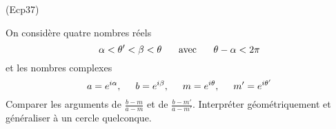 \begin{tiny}(Ecp37)\end{tiny} On considère quatre nombres réels
\begin{displaymath}
  \alpha < \theta' < \beta < \theta \hspace{0.5cm}\text{ avec } \hspace{0.5cm}\theta - \alpha < 2\pi 
\end{displaymath}
et les nombres complexes
\begin{displaymath}
  a = e^{i\alpha},\hspace{0.5cm} b = e^{i\beta},\hspace{0.5cm} m = e^{i\theta},\hspace{0.5cm} m' = e^{i\theta'}
\end{displaymath}
Comparer les arguments de $\frac{b-m}{a-m}$ et de $\frac{b-m'}{a-m'}$.\newline
Interpréter géométriquement et généraliser à un cercle quelconque.

